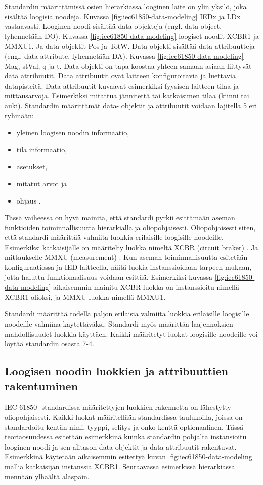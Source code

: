 Standardin määrittämissä osien hierarkiassa looginen laite on ylin yksilö, joka sisältää loogisia noodeja. Kuvassa \ref{fig:iec61850-data-modeling} IEDx ja LDx vastaavasti. Looginen noodi sisältää data objekteja (engl. data object, lyhennetään DO). Kuvassa \ref{fig:iec61850-data-modeling} loogiset noodit XCBR1 ja MMXU1. Ja data objektit Pos ja TotW. Data objekti sisältää data attribuutteja (engl. data attribute, lyhennetään DA). Kuvassa \ref{fig:iec61850-data-modeling} Mag, stVal, q ja t. Data objekti on tapa koostaa yhteen samaan asiaan liittyvät data attribuutit. Data attribuutit ovat laitteen konfiguroitavia ja luettavia datapisteitä. Data attribuutit kuvaavat esimerkiksi fyysisen laitteen tilaa ja mittausarvoja. Esimerkiksi mitattua jännitettä tai katkaisimen tilaa (kiinni tai auki). Standardin määrittämät data- objektit ja attribuutit voidaan lajitella 5 eri ryhmään:
\begin{itemize}
	\item yleinen loogisen noodin informaatio,
	\item tila informaatio,
	\item asetukset,
	\item mitatut arvot ja
	\item ohjaus \cite[s.~25]{IEC61850-1}.
\end{itemize}

Tässä vaiheessa on hyvä mainita, että standardi pyrkii esittämään aseman funktioiden toiminnallisuutta hierarkialla ja oliopohjaisesti. Oliopohjaisesti siten, että standardi määrittää valmiita luokkia erilaisille loogisille noodeille. Esimerkiksi katkaisijalle on määritelty luokka nimeltä XCBR (circuit braker) \cite[s.~105--106]{IEC61850-7-4}. Ja mittaukselle MMXU (measurement) \cite[s.~57--58]{IEC61850-7-4}. Kun aseman toiminnallisuutta esitetään konfiguraatiossa ja IED-laitteella, näitä luokia instanssioidaan tarpeen mukaan, jotta haluttu funktionaalisuus voidaan esittää. Esimerkiksi kuvassa \ref{fig:iec61850-data-modeling} aikaisemmin mainitu XCBR-luokka on instanssioitu nimellä XCBR1 olioksi, ja MMXU-luokka nimellä MMXU1.

Standardi määrittää todella paljon erilaisia valmiita luokkia erilaisille loogisille noodeille valmiina käytettäväksi. Standardi myös määrittää laajennoksien mahdollisuudet luokkia käyttäen. Kaikki määritetyt luokat loogisille noodeille voi löytää standardin osasta 7-4.


\subsection{Loogisen noodin luokkien ja attribuuttien rakentuminen}
IEC 61850 -standardissa määritettyjen luokkien rakennetta on lähestytty oliopohjaisesti. Kaikki luokat määritellään standardissa taulukoilla, joissa on standardoitu kentän nimi, tyyppi, selitys ja onko kenttä optionaalinen. Tässä teoriaosuudessa esitetään esimerkkinä kuinka standardin pohjalta instansioitu looginen noodi ja sen alitason data objektit ja data attribuutit rakentuvat. Esimerkkinä käytetään aikaisemmin esitettyä kuvan \ref{fig:iec61850-data-modeling} mallia katkaisijan instanssia XCBR1. Seuraavassa esimerkissä hierarkiassa mennään ylhäältä alaspäin.

